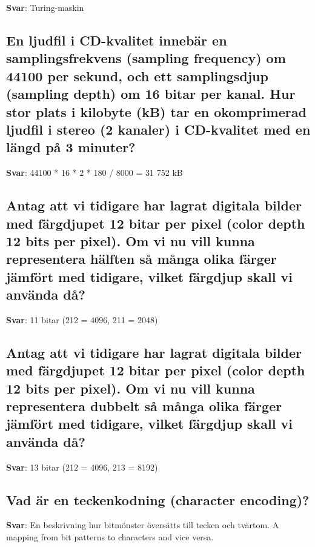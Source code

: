 \documentclass[a4paper,11pt,oneside]{article}
\begin{document}
\begin{sloppypar}
\label{q:64:sa:sv:True}

\textbf{Svar}: Turing-maskin



\subsection{En ljudfil i CD-kvalitet inneb\"ar en samplingsfrekvens (sampling frequency) om 44100 per sekund, och ett samplingsdjup (sampling depth) om 16 bitar per kanal. Hur stor plats i kilobyte (kB) tar en okomprimerad ljudfil i stereo (2 kanaler) i CD-kvalitet med en l\"angd p\r{a} 3 minuter?}

\label{q:65:sa:sv:True}

\textbf{Svar}: 44100 * 16 * 2 * 180 / 8000 = 31 752 kB



\subsection{Antag att vi tidigare har lagrat digitala bilder med f\"argdjupet 12 bitar per pixel (color depth 12 bits per pixel). Om vi nu vill kunna representera h\"alften s\r{a} m\r{a}nga olika f\"arger j\"amf\"ort med tidigare, vilket f\"argdjup skall vi anv\"anda d\r{a}?}

\label{q:66:sa:sv:True}

\textbf{Svar}: 11 bitar (212 = 4096, 211 = 2048)



\subsection{Antag att vi tidigare har lagrat digitala bilder med f\"argdjupet 12 bitar per pixel (color depth 12 bits per pixel). Om vi nu vill kunna representera dubbelt s\r{a} m\r{a}nga olika f\"arger j\"amf\"ort med tidigare, vilket f\"argdjup skall vi anv\"anda d\r{a}?}

\label{q:67:sa:sv:True}

\textbf{Svar}: 13 bitar (212 = 4096, 213 = 8192)



\subsection{Vad \"ar en teckenkodning (character encoding)?}

\label{q:68:sa:sv:True}

\textbf{Svar}: En beskrivning hur bitm\"onster \"overs\"atts till tecken och tv\"artom. A mapping from bit patterns to characters and vice versa.




\end{sloppypar}
\end{document}
